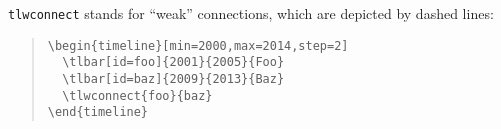 \documentclass{article}
\begin{document}
\texttt{tlwconnect} stands for ``weak'' connections, which are depicted by dashed lines:
\begin{quote}\small
\begin{verbatim}
\begin{timeline}[min=2000,max=2014,step=2]
  \tlbar[id=foo]{2001}{2005}{Foo}
  \tlbar[id=baz]{2009}{2013}{Baz}
  \tlwconnect{foo}{baz}
\end{timeline}
\end{verbatim}
\end{quote}
\begin{quote}
\begin{timeline}[min=2000,max=2014,step=2]
\end{timeline}
\end{quote}
\end{document}
